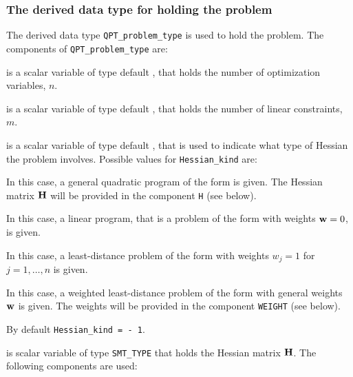 \documentclass{galahad}
\begin{document}

\subsubsection{The derived data type for holding the problem}\label{typeprob}
The derived data type {\tt QPT\_problem\_type} is used to hold 
the problem. The components of 
{\tt QPT\_problem\_type} 
are:

\begin{description}

 is a scalar variable of type default \integer, 
 that holds the number of optimization variables, $n$.  
              
 is a scalar variable of type default \integer, 
 that holds the number of linear constraints, $m$.
              
 is a scalar variable of type default \integer, 
that is used to indicate what type of Hessian the problem involves.
Possible values for {\tt Hessian\_kind} are:

\begin{description}
  In this case, a general quadratic program of the form
 is given. The Hessian matrix ${\mathbf{H}}$ will be provided in the 
component {\tt H} (see below).

  In this case, a linear program, that is a problem of the form 
 with weights ${\mathbf{w}} = 0$, is given.

 In this case, a least-distance problem of the form 
with weights $w_{j} = 1$ for $j = 1, \ldots , n$ is given.

 In this case, a weighted least-distance problem of the form 
with general weights ${\mathbf{w}}$ is given. The weights will be
provided in the component {\tt WEIGHT} (see below).
\end{description}
By default {\tt Hessian\_kind = - 1}.

 is scalar variable of type {\tt SMT\_TYPE} 
that holds the Hessian matrix ${\mathbf{H}}$. The following components
are used:

\begin{description}


\end{description}
\end{description}
\end{document}

